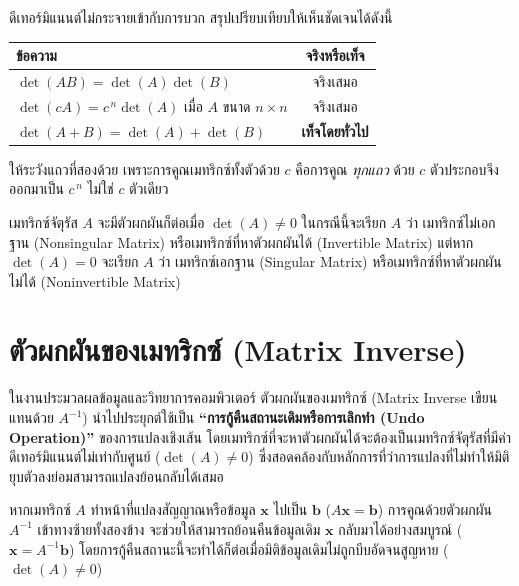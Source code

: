 \begin{warning}
ดีเทอร์มิแนนต์ไม่กระจายเข้ากับการบวก สรุปเปรียบเทียบให้เห็นชัดเจนได้ดังนี้

\begin{center}
\begin{tabular}{|l|c|}
\hline
\textbf{ข้อความ} & \textbf{จริงหรือเท็จ} \\
\hline
$\det(AB) = \det(A)\det(B)$ & จริงเสมอ \\
\hline
$\det(cA) = c^{\,n}\det(A)$ เมื่อ $A$ ขนาด $n \times n$ & จริงเสมอ \\
\hline
$\det(A + B) = \det(A) + \det(B)$ & \textbf{เท็จโดยทั่วไป} \\
\hline
\end{tabular}
\end{center}

ให้ระวังแถวที่สองด้วย เพราะการคูณเมทริกซ์ทั้งตัวด้วย $c$ คือการคูณ \emph{ทุกแถว} ด้วย $c$ ตัวประกอบจึงออกมาเป็น $c^{\,n}$ ไม่ใช่ $c$ ตัวเดียว
\end{warning}

\begin{prop}
เมทริกซ์จัตุรัส $A$ จะมีตัวผกผันก็ต่อเมื่อ $\det(A) \neq 0$ ในกรณีนี้จะเรียก $A$ ว่า เมทริกซ์ไม่เอกฐาน (Nonsingular Matrix) หรือเมทริกซ์ที่หาตัวผกผันได้ (Invertible Matrix) แต่หาก $\det(A) = 0$ จะเรียก $A$ ว่า เมทริกซ์เอกฐาน (Singular Matrix) หรือเมทริกซ์ที่หาตัวผกผันไม่ได้ (Noninvertible Matrix)
\end{prop}

\section{ตัวผกผันของเมทริกซ์ (Matrix Inverse)}
\label{sec:matrix-inverse}

ในงานประมวลผลข้อมูลและวิทยาการคอมพิวเตอร์ ตัวผกผันของเมทริกซ์ (Matrix Inverse เขียนแทนด้วย $A^{-1}$) นำไปประยุกต์ใช้เป็น \textbf{``การกู้คืนสถานะเดิมหรือการเลิกทำ (Undo Operation)''} ของการแปลงเชิงเส้น โดยเมทริกซ์ที่จะหาตัวผกผันได้จะต้องเป็นเมทริกซ์จัตุรัสที่มีค่าดีเทอร์มิแนนต์ไม่เท่ากับศูนย์ ($\det(A) \neq 0$) ซึ่งสอดคล้องกับหลักการที่ว่าการแปลงที่ไม่ทำให้มิติยุบตัวลงย่อมสามารถแปลงย้อนกลับได้เสมอ~\parencite{kolman2008discrete}

หากเมทริกซ์ $A$ ทำหน้าที่แปลงสัญญาณหรือข้อมูล $\mathbf{x}$ ไปเป็น $\mathbf{b}$ ($A\mathbf{x} = \mathbf{b}$) การคูณด้วยตัวผกผัน $A^{-1}$ เข้าทางซ้ายทั้งสองข้าง จะช่วยให้สามารถย้อนคืนข้อมูลเดิม $\mathbf{x}$ กลับมาได้อย่างสมบูรณ์ ($\mathbf{x} = A^{-1}\mathbf{b}$) โดยการกู้คืนสถานะนี้จะทำได้ก็ต่อเมื่อมิติข้อมูลเดิมไม่ถูกบีบอัดจนสูญหาย ($\det(A) \neq 0$)

